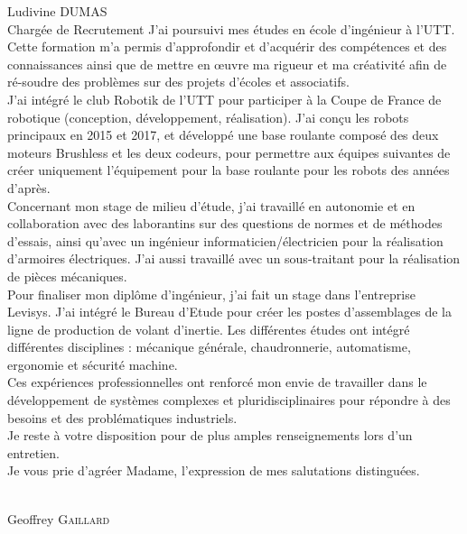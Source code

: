 \documentclass[a4paper,10pt,firstfoot=false]{scrlttr2}
\begin{document}
\begin{letter}{Ludivine DUMAS \\ Chargée de Recrutement}
J’ai poursuivi mes études en école d’ingénieur à l’UTT. Cette formation m’a permis d’approfondir et d’acquérir des compétences et des connaissances ainsi que de mettre en œuvre ma rigueur et ma créativité afin de ré-soudre des problèmes sur des projets d’écoles et associatifs.\\

J'ai intégré le club Robotik de l'UTT pour participer à la Coupe de France de robotique (conception, développement, réalisation). J'ai conçu les robots principaux en 2015 et 2017, et développé une base roulante composé des deux moteurs Brushless et les deux codeurs, pour permettre aux équipes suivantes de créer uniquement l'équipement pour la base roulante pour les robots des années d'après.\\

Concernant mon stage de milieu d’étude, j’ai travaillé en autonomie et en collaboration avec des laborantins sur des questions de normes et de méthodes d’essais, ainsi qu’avec un ingénieur informaticien/électricien pour la réalisation d’armoires électriques. J’ai aussi travaillé avec un sous-traitant pour la réalisation de pièces mécaniques.\\

Pour finaliser mon diplôme d'ingénieur, j'ai fait un stage dans l'entreprise Levisys. J'ai intégré le Bureau d'Etude pour créer les postes d'assemblages de la ligne de production de volant d'inertie. Les différentes études ont intégré différentes disciplines : mécanique générale, chaudronnerie, automatisme, ergonomie et sécurité machine.\\

Ces expériences professionnelles ont renforcé mon envie de travailler dans le développement de systèmes complexes et pluridisciplinaires pour répondre à des besoins et des problématiques industriels.\\

Je reste à votre disposition pour de plus amples renseignements lors d’un entretien.\\
Je vous prie d’agréer Madame, l’expression de mes salutations distinguées.

\begin{flushright}
\\[6ex] Geoffrey \textsc{Gaillard}
\end{flushright}

\end{letter}
\end{document}
